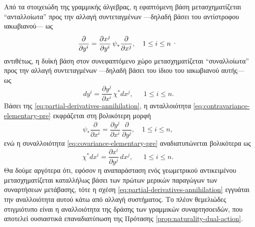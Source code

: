 \documentclass[11pt,a4paper,twoside,openright]{book}
\begin{document}
Από τα στοιχειώδη της γραμμικής άλγεβρας,
η εφαπτόμενη βάση μετασχηματίζεται
``ανταλλοίωτα'' προς την αλλαγή συντεταγμένων
---δηλαδή βάσει του αντίστροφου ιακωβιανού--- ως
\begin{equation}\label{eq:contravariance-elementary-pre}
\frac{\partial}{\partial y ^ i}
=
\frac{\partial x^j}{\partial y^i} \, \psi_* \frac{\partial}{\partial x^j},
\quad
1 \le i \le n \, \textup{·}
\end{equation}
αντιθέτως, η δυϊκή βάση στον συνεφαπτόμενο χώρο μετασχηματίζεται
``συναλλοίωτα'' προς την αλλαγή συντεταγμένων
---δηλαδή βάσει του ίδιου του ιακωβιανού αυτής--- ως
\begin{equation}\label{eq:covariance-elementary-pre}
\, dy^i
=
\frac{\partial y^j}{\partial x^i} \, \chi^* dx^j,
\quad
\, \, \, 1 \le i \le n.
\end{equation}
Βάσει της \eqref{eq:partial-derivatives-annihilation},
η ανταλλοιότητα \eqref{eq:contravariance-elementary-pre}
εκφράζεται στη βολικότερη μορφή
\begin{equation}\label{eq:contravariance-elementary}
\psi_* \frac{\partial}{\partial x^i}
=
\frac{\partial y^j}{\partial x^i} \, \frac{\partial}{\partial y^j},
\quad
1 \le i \le n,
\end{equation}
ενώ η συναλλοιότητα \eqref{eq:covariance-elementary-pre}
αναδιατυπώνεται βολικότερα ως
\begin{equation}\label{eq:covariance-elementary}
\chi^* dx^i
=
\frac{\partial x^i}{\partial y^j} \, dx^j,
\quad
\, \, \, 1 \le i \le n.
\end{equation}
Θα δούμε αργότερα ότι, εφόσον η αναπαράσταση ενός γεωμετρικού αντικειμένου μετασχηματίζεται καταλλήλως βάσει των πρώτων μερικών παραγώγων των συναρτήσεων μετάβασης,
τότε η σχέση \eqref{eq:partial-derivatives-annihilation}
εγγυάται την αναλλοιότητα αυτού κάτω από αλλαγή συστήματος.
Το πλέον θεμελιώδες στιγμιότυπο είναι η αναλλοιότητα της δράσης των γραμμικών συναρτησοειδών, που αποτελεί ουσιαστικά επαναδιατύπωση της Πρότασης \ref{prop:naturality-dual-action}.
\end{document}
